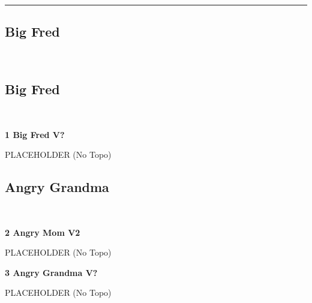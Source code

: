 \rule{\textwidth}{1pt}
\begin{multicols}{2}
		\section{Big Fred}\label{sa:Big Fred}
	\begin{minipage}{\columnwidth}
	\
	\end{minipage}

			\subsection*{Big Fred}\label{bf:Big Fred}
			\begin{minipage}{\columnwidth}
			\
			\end{minipage}
			
					\begin{minipage}{\linewidth}	
					\label{rt:Big Fred}\colorbox{black!20}{\textbf{1 Big Fred V?  }}
					\begin{adjustwidth}{0.5cm}{}				
					PLACEHOLDER
						\newline (No Topo) 
					\end{adjustwidth}
					\end{minipage}
			\subsection*{Angry Grandma}\label{bf:Angry Grandma}
			\begin{minipage}{\columnwidth}
			\
			\end{minipage}
			
					\begin{minipage}{\linewidth}	
					\label{rt:Angry Mom}\colorbox{green!20}{\textbf{2 Angry Mom V2  }}
					\begin{adjustwidth}{0.5cm}{}				
					PLACEHOLDER
						\newline (No Topo) 
					\end{adjustwidth}
					\end{minipage}
					\begin{minipage}{\linewidth}	
					\label{rt:Angry Grandma}\colorbox{black!20}{\textbf{3 Angry Grandma V?  }}
					\begin{adjustwidth}{0.5cm}{}				
					PLACEHOLDER
						\newline (No Topo) 
					\end{adjustwidth}
					\end{minipage}
\end{multicols}
\clearpage
